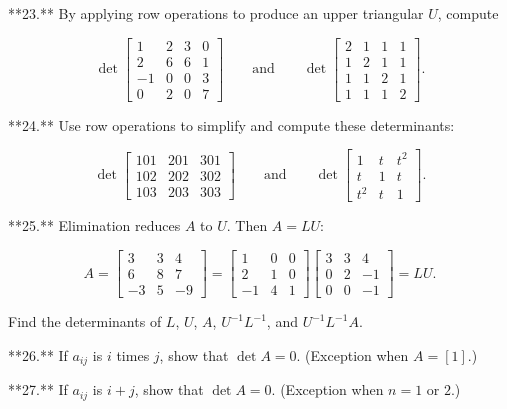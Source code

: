 

**23.** By applying row operations to produce an upper triangular \(U\), compute

\[\det\left[\begin{matrix}1&2&3&0\\ 2&6&6&1\\ -1&0&0&3\\ 0&2&0&7\end{matrix}\right]\qquad\text{and}\qquad\det\left[\begin{matrix}2&1&1&1 \\ 1&2&1&1\\ 1&1&2&1\\ 1&1&1&2\end{matrix}\right].\]

**24.** Use row operations to simplify and compute these determinants:

\[\det\left[\begin{matrix}101&201&301\\ 102&202&302\\ 103&203&303\end{matrix}\right]\qquad\text{and}\qquad\det\left[\begin{matrix}1 &t&t^{2}\\ t&1&t\\ t^{2}&t&1\end{matrix}\right].\]

**25.** Elimination reduces \(A\) to \(U\). Then \(A=LU\):

\[A=\left[\begin{matrix}3&3&4\\ 6&8&7\\ -3&5&-9\end{matrix}\right]=\left[\begin{matrix}1&0&0\\ 2&1&0\\ -1&4&1\end{matrix}\right]\left[\begin{matrix}3&3&4\\ 0&2&-1\\ 0&0&-1\end{matrix}\right]=LU.\]

Find the determinants of \(L\), \(U\), \(A\), \(U^{-1}L^{-1}\), and \(U^{-1}L^{-1}A\).

**26.** If \(a_{ij}\) is \(i\) times \(j\), show that \(\det A=0\). (Exception when \(A=[1]\).)

**27.** If \(a_{ij}\) is \(i+j\), show that \(\det A=0\). (Exception when \(n=1\) or \(2\).)

